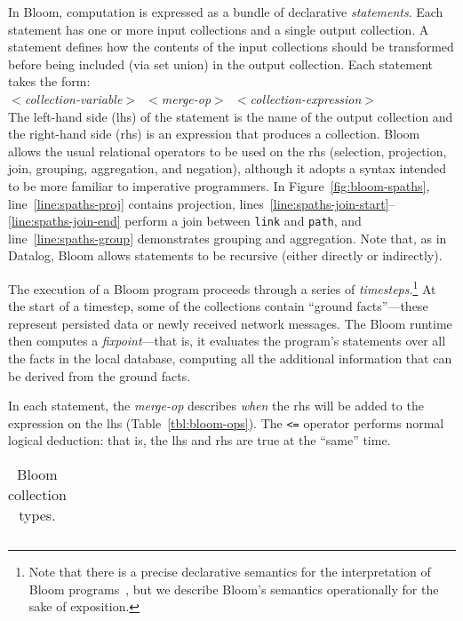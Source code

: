 In Bloom, computation is expressed as a bundle of declarative
\emph{statements}. Each statement has one or more input collections and a single
output collection. A statement defines how the contents of the input
collections should be transformed before being included (via set union) in the
output collection. Each statement takes the form: \\ \noindent
\mbox{\hspace{0.25in}\emph{$<$collection-variable$>$ $<$merge-op$>$
    $<$collection-expression$>$}}\\ \noindent
The left-hand side (lhs) of the statement is the name of the output collection
and the right-hand side (rhs) is an expression that produces a collection. Bloom
allows the usual relational operators to be used on the rhs (selection, projection,
join, grouping, aggregation, and negation), although it adopts a syntax intended
to be more familiar to imperative programmers. In Figure~\ref{fig:bloom-spaths},
line~\ref{line:spaths-proj} contains projection,
lines~\ref{line:spaths-join-start}--\ref{line:spaths-join-end} perform a join
between \texttt{link} and \texttt{path}, and line~\ref{line:spaths-group}
demonstrates grouping and aggregation. Note that, as in Datalog, Bloom allows
statements to be recursive (either directly or indirectly). %

The execution of a Bloom program proceeds through a series of
\emph{timesteps}.\footnote{Note that there is a precise declarative semantics
  for the interpretation of Bloom programs~\cite{dedalus}, but we describe
  Bloom's semantics operationally for the sake of exposition.} At the start of a
timestep, some of the collections contain ``ground facts''---these represent
persisted data or newly received network messages. The Bloom runtime then
computes a \emph{fixpoint}---that is, it evaluates the program's statements over
all the facts in the local database, computing all the additional information
that can be derived from the ground facts.

In each statement, the \emph{merge-op} describes \emph{when} the rhs will be
added to the expression on the lhs (Table~\ref{tbl:bloom-ops}). The \verb|<=|
operator performs normal logical deduction: that is, the lhs and rhs are true at
the ``same'' time.

\begin{table}
\begin{tabular}{|c|l|}
\end{tabular}
\caption{Bloom collection types.}
\label{tbl:bloom-collections}
\end{table}

